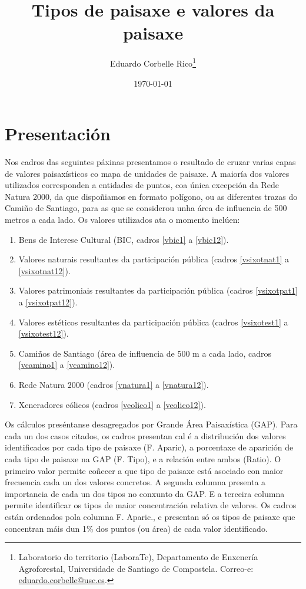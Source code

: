\documentclass[11pt,a4paper]{article}
\title{Tipos de paisaxe e valores da paisaxe}
\author{Eduardo Corbelle Rico\thanks{Laboratorio do territorio (LaboraTe), Departamento de Enxener\'ia Agroforestal, Universidade de Santiago de Compostela. Correo-e: \href{mailto:eduardo.corbelle@usc.es}{eduardo.corbelle@usc.es}.}}
\date{\today}
\begin{document}
\maketitle




\section{Presentación}

Nos cadros das seguintes páxinas presentamos o resultado de cruzar varias capas de valores paisaxísticos co mapa de unidades de paisaxe. A maioría dos valores utilizados corresponden a entidades de puntos, coa única excepción da Rede Natura 2000, da que dispoñiamos en formato polígono, ou as diferentes trazas do Camiño de Santiago, para as que se considerou unha área de influencia de 500 metros a cada lado. Os valores utilizados ata o momento inclúen:

\begin{enumerate}
 \item Bens de Interese Cultural (BIC, cadros \ref{vbic1} a \ref{vbic12}).
 \item Valores naturais resultantes da participación pública (cadros \ref{vsixotnat1} a \ref{vsixotnat12}).
 \item Valores patrimoniais resultantes da participación pública (cadros \ref{vsixotpat1} a \ref{vsixotpat12}).
 \item Valores estéticos resultantes da participación pública (cadros \ref{vsixotest1} a \ref{vsixotest12}).
 \item Camiños de Santiago (área de influencia de 500 m a cada lado, cadros \ref{vcamino1} a \ref{vcamino12}).
 \item Rede Natura 2000 (cadros \ref{vnatura1} a \ref{vnatura12}).
 \item Xeneradores eólicos (cadros \ref{veolico1} a \ref{veolico12}).
\end{enumerate}

Os cálculos preséntanse desagregados por Grande Área Paisaxística (GAP). Para cada un dos casos citados, os cadros presentan cal é a distribución dos valores identificados por cada tipo de paisaxe (F. Aparic), a porcentaxe de aparición de cada tipo de paisaxe na GAP (F. Tipo), e a relación entre ambos (Ratio). O primeiro valor permite coñecer a que tipo de paisaxe está asociado con maior frecuencia cada un dos valores concretos. A segunda columna presenta a importancia de cada un dos tipos no conxunto da GAP. E a terceira columna permite identificar os tipos de maior concentración relativa de valores. Os cadros están ordenados pola columna F. Aparic., e presentan só os tipos de paisaxe que concentran máis dun 1\% dos puntos (ou área) de cada valor identificado.
\end{document}
